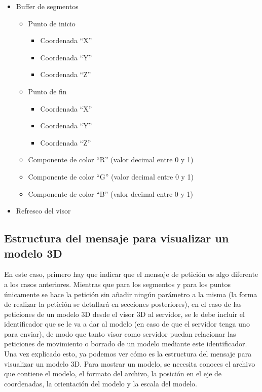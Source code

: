 \begin{itemize}
	\item Buffer de segmentos
	\begin{itemize}
		\item Punto de inicio
		\begin{itemize}
			\item Coordenada ``X''
			\item Coordenada ``Y''
			\item Coordenada ``Z''
		\end{itemize}
		\item Punto de fin
		\begin{itemize}
			\item Coordenada ``X''
			\item Coordenada ``Y''
			\item Coordenada ``Z''
		\end{itemize}
		\item Componente de color ``R'' (valor decimal entre 0 y 1)
		\item Componente de color ``G'' (valor decimal entre 0 y 1)
		\item Componente de color ``B'' (valor decimal entre 0 y 1)
	\end{itemize}
	\item Refresco del visor
\end{itemize}

\subsection{Estructura del mensaje para visualizar un modelo 3D}
En este caso, primero hay que indicar que el mensaje de petición es algo diferente a los casos anteriores. Mientras que para los segmentos y para los puntos únicamente se hace la petición sin añadir ningún parámetro a la misma (la forma de realizar la petición se detallará en secciones posteriores), en el caso de las peticiones de un modelo 3D desde el visor 3D al servidor, se le debe incluir el identificador que se le va a dar al modelo (en caso de que el servidor tenga uno para enviar), de modo que tanto visor como servidor puedan relacionar las peticiones de movimiento o borrado de un modelo mediante este identificador.
Una vez explicado esto, ya podemos ver cómo es la estructura del mensaje para visualizar un modelo 3D. Para mostrar un modelo, se necesita conoces el archivo que contiene el modelo, el formato del archivo, la posición en el eje de coordenadas, la orientación del modelo y la escala del modelo. 

